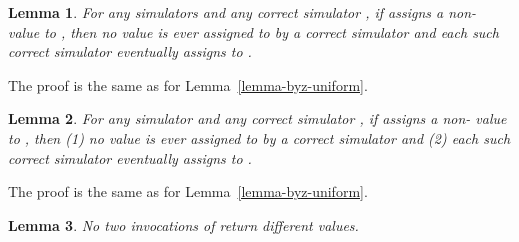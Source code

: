 \documentclass[11pt,letterpaper]{article}
\newtheorem{lemma}{Lemma}
\newlength {\afterproof}
\newcommand{\toto}{xxx}
\newenvironment{proofL}{\noindent{\bf Proof }}
{\hspace*{\fill}\par\vspace{\afterproof}}
\begin{document}
\begin{lemma}
For any  simulators   and any correct  simulator , if
 assigns a non- value   to , then
 no value  is ever assigned to  by
a  correct simulator   and   each  such  correct  simulator 
eventually assigns  to .
\label{lemma-byz-uniform-reads}
\end{lemma}

\begin{proofL}
The proof is the same as for Lemma~\ref{lemma-byz-uniform}.
\renewcommand{\toto}{lemma-byz-uniform-reads}
\end{proofL}


\begin{lemma}
For any simulator  and any correct simulator , if  assigns a
non- value    to ,
then (1) no value  is ever assigned to  by
a  correct simulator    and   (2) each  such  correct simulator  
eventually assigns  to .
\label{lemma-byz-uniform-view}
\end{lemma}

\begin{proofL}
The proof is the same as for Lemma~\ref{lemma-byz-uniform}.
\renewcommand{\toto}{lemma-byz-uniform-view}
\end{proofL}

\begin{lemma}
\label{lemma:safe-byz-agreement}
No two invocations of  return different values.
\end{lemma}
\end{document}
